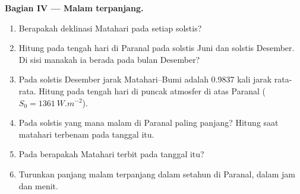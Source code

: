\begin{problem}
\medskip
\noindent\textbf{Bagian IV --- Malam terpanjang.}
\begin{enumerate}[resume]
  \item Berapakah deklinasi Matahari pada setiap solstis?
  \item Hitung  pada tengah hari di Paranal pada solstis Juni dan solstis Desember. Di sisi  manakah ia berada pada bulan Desember?
  \item Pada solstis Desember jarak Matahari--Bumi adalah 0.9837 kali jarak rata-rata. Hitung  pada tengah hari di puncak atmosfer di atas Paranal ($S_0 = \qty{1361}{W.m^{-2}}$).
  \item Pada solstis yang mana malam di Paranal paling panjang? Hitung  saat matahari terbenam pada tanggal itu.
  \item Pada  berapakah Matahari terbit pada tanggal itu?
  \item Turunkan panjang malam terpanjang dalam setahun di Paranal, dalam jam dan menit.
\end{enumerate}
\end{problem}
